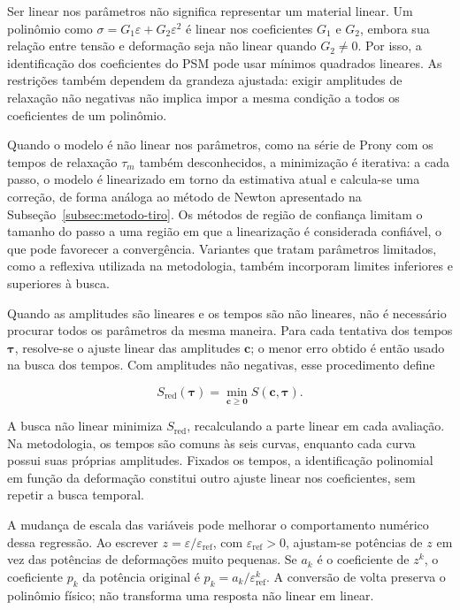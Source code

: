 \documentclass[arial,centeredequations,english,brazilian,oneside,section=TITLE]{ifes8}
\begin{document}
Ser linear nos parâmetros não significa representar um material linear.
Um polinômio como $\sigma=G_1\varepsilon+G_2\varepsilon^2$ é linear nos
coeficientes $G_1$ e $G_2$, embora sua relação entre tensão e deformação
seja não linear quando $G_2\neq0$. Por isso, a identificação dos coeficientes
do PSM pode usar mínimos quadrados lineares. As restrições também dependem
da grandeza ajustada: exigir amplitudes de relaxação não negativas não
implica impor a mesma condição a todos os coeficientes de um polinômio.

Quando o modelo é não linear nos parâmetros, como na série de Prony com os tempos de
relaxação $\tau_m$ também desconhecidos, a minimização é iterativa: a cada passo, o modelo
é linearizado em torno da estimativa atual e calcula-se uma correção, de forma análoga ao
método de Newton apresentado na Subseção~\ref{subsec:metodo-tiro}. Os métodos de região de
confiança limitam o tamanho do passo a uma região em que a linearização é considerada
confiável, o que pode favorecer a convergência. Variantes que tratam parâmetros
limitados, como a reflexiva utilizada na metodologia, também incorporam
limites inferiores e superiores à busca.

Quando as amplitudes são lineares e os tempos são não lineares, não é necessário
procurar todos os parâmetros da mesma maneira. Para cada tentativa dos tempos
$\boldsymbol\tau$, resolve-se o ajuste linear das amplitudes $\mathbf c$;
o menor erro obtido é então usado na busca dos tempos. Com amplitudes
não negativas, esse procedimento define

\begin{equation}
  S_{\mathrm{red}}(\boldsymbol\tau)
    =\min_{\mathbf c\geq\mathbf0}S(\mathbf c,\boldsymbol\tau).
  \label{eq:ajuste-separavel-prony}
\end{equation}

A busca não linear minimiza $S_{\mathrm{red}}$, recalculando a parte linear
em cada avaliação. Na metodologia, os tempos são comuns às seis curvas,
enquanto cada curva possui suas próprias amplitudes. Fixados os tempos,
a identificação polinomial em função da deformação constitui outro ajuste
linear nos coeficientes, sem repetir a busca temporal.

A mudança de escala das variáveis pode melhorar o comportamento numérico dessa
regressão. Ao escrever $z=\varepsilon/\varepsilon_{\mathrm{ref}}$,
com $\varepsilon_{\mathrm{ref}}>0$, ajustam-se potências de $z$ em vez
das potências de deformações muito pequenas. Se $a_k$ é o coeficiente de
$z^k$, o coeficiente $p_k$ da potência original é
$p_k=a_k/\varepsilon_{\mathrm{ref}}^k$. A conversão de volta preserva
o polinômio físico; não transforma uma resposta não linear em linear.
\end{document}
